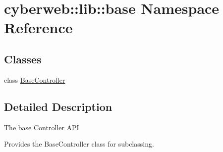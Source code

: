 \hypertarget{namespacecyberweb_1_1lib_1_1base}{\section{cyberweb\-:\-:lib\-:\-:base \-Namespace \-Reference}
\label{namespacecyberweb_1_1lib_1_1base}
}
\subsection*{\-Classes}
\begin{DoxyCompactItemize}
\item 
class \hyperlink{classcyberweb_1_1lib_1_1base_1_1_base_controller}{\-Base\-Controller}
\end{DoxyCompactItemize}


\subsection{\-Detailed \-Description}
\begin{DoxyVerb}The base Controller API

Provides the BaseController class for subclassing.
\end{DoxyVerb}
 